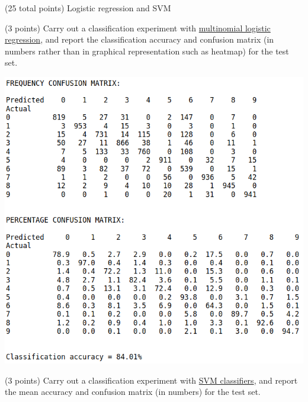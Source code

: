 \documentclass[12pt]{article}
\begin{document}
\begin{question}{(25 total points) Logistic regression and SVM}

  


  \medskip
   \begin{subquestion}{(3 points)
       Carry out a classification experiment with
       \href{https://scikit-learn.org/0.19/modules/generated/sklearn.linear\_model.LogisticRegression.html}{multinomial logistic regression},
       and report the classification accuracy and confusion matrix (in
       numbers rather than in graphical representation such as heatmap)
       for the test set.
     } \label{Q2.1}


   

      \begin{answerbox}{37em}
         \includegraphics[width=1\textwidth]{images/q21.png}
      \end{answerbox}
  


   \end{subquestion}
   \begin{subquestion}{(3 points)
       Carry out a classification experiment with
       \href{https://scikit-learn.org/0.19/modules/generated/sklearn.svm.SVC.html}{SVM classifiers}, and report the
       mean accuracy and confusion matrix (in numbers) for the test
       set.
     } \label{Q2.2}



\end{subquestion}
\end{question}
\end{document}
